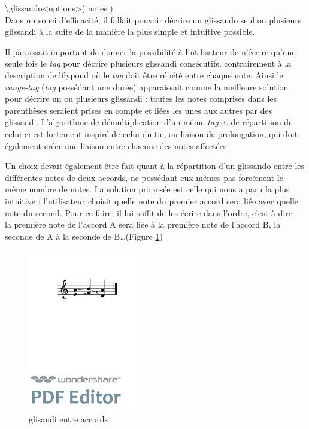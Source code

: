 \documentclass{article}
\newenvironment{code}
  {\fontfamily{pnc}\selectfont}{}
\begin{document}
\begin{code}
\textbackslash{}glissando\textless{}options\textgreater{}( notes )
\end{code}
\\

Dans un souci d'efficacité, il fallait pouvoir décrire un glissando seul ou plusieurs glissandi à la suite de la manière la plus simple et intuitive possible. 

Il paraissait important de donner la possibilité à l'utilisateur de n'écrire qu'une seule fois le \emph{tag} pour décrire plusieurs glissandi consécutifs, contrairement à la description de lilypond où le \emph{tag} doit être répété entre chaque note. Ainsi le \emph{range-tag} (\emph{tag} possédant une durée) apparaissait comme la meilleure solution pour décrire un ou plusieurs glissandi : toutes les notes comprises dans les parenthèses seraient prises en compte et liées les unes aux autres par des glissandi. L'algorithme de démultiplication d'un même \emph{tag} et de répartition de celui-ci est fortement inspiré de celui du tie, ou liaison de prolongation, qui doit également créer une liaison entre chacune des notes affectées.

Un choix devait également être fait quant à la répartition d'un glissando entre les différentes notes de deux accords, ne possédant eux-mêmes pas forcément le même nombre de notes. La solution proposée est celle qui nous a paru la plus intuitive : l'utilisateur choisit quelle note du premier accord sera liée avec quelle note du second. Pour ce faire, il lui suffit de les écrire dans l'ordre, c'est à dire : la première note de l'accord A sera liée à la première note de l'accord B, la seconde de A à la seconde de B\dots (Figure \ref{fig:glissandosimple})

\begin{figure}[h]
\begin{center}
\begin{code}
[\textbackslash{}glissando(\{e,a\} \{f,b\} \{a,d\})]
\end{code}

\includegraphics[width=5cm]{img/glissandosimple.pdf}
\caption{glisandi entre accords}
\label{fig:glissandosimple}
\end{center}
\end{figure}
\end{document}
